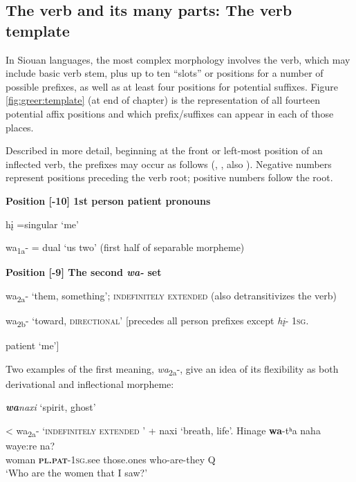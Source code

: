 \documentclass[output=paper]{LSP/langsci}
\begin{document}
\subsection{The verb and its many parts: The verb template}\label{sec:greer:3.2}\label{verbanditsmanyparts}  
	  									                      
In Siouan languages, the most complex morphology involves the verb, which may include basic verb stem, plus up to ten ``slots'' or positions for a number of possible prefixes, as well as at least four positions for potential suffixes.  Figure \ref{fig:greer:template} (at end of chapter) is the representation of all fourteen potential affix positions and which prefix/suffixes can appear in each of those places. 

Described in more detail, beginning at the front or left-most position of an inflected verb, the prefixes may occur as follows (\citealt[246]{Whitman1947}, \citealt{Marsh1936}, also \citealt{HopkinsFurbee1991}). Negative numbers represent positions preceding the verb root; positive numbers follow the root.

\vspace{1em}
\textbf{Position [-10] 	1st person patient pronouns} 	

\hspace{2em} h\k{i} =singular `me' 
												
\hspace{2em} wa\textsubscript{1a}- = dual  `us two'	 (first half of separable morpheme)					           

\vspace{1em}
\textbf{Position [-9] 	The second \textit{wa-}  set} 	
										
\hspace{2em} wa\textsubscript{2a}- `them, something'; \textsc{indefinitely extended } (also detransitivizes the verb)		
	
\hspace{2em} wa\textsubscript{2b}- `toward, \textsc{directional}' 	[precedes all person prefixes except \textit{h\k{i}}- 1\textsc{sg}.

\hspace{3em} patient `me'] 	 				      

\vspace{1em}
Two examples of the first meaning, \textit{wa}\textsubscript{2a}-, give an idea of its flexibility as both derivational and inflectional morpheme:    	

\begin{exe}
\ex
\begin{xlist}
\ex \textit{\textbf{wa}naxi} `spirit, ghost' 

< wa\textsubscript{2a}- `\textsc{indefinitely extended }' + naxi `breath, life'.                  	
\ex \gll Hinage   \textbf{wa}-tʰa  naha   waye:re  na?  \\           			
woman   \textbf{\textsc{pl.pat}}-\textsc{1sg.}see  those.ones who-are-they Q	\\
\trans `Who are the women that I saw?'
\end{xlist}
\end{exe}
\end{document}
